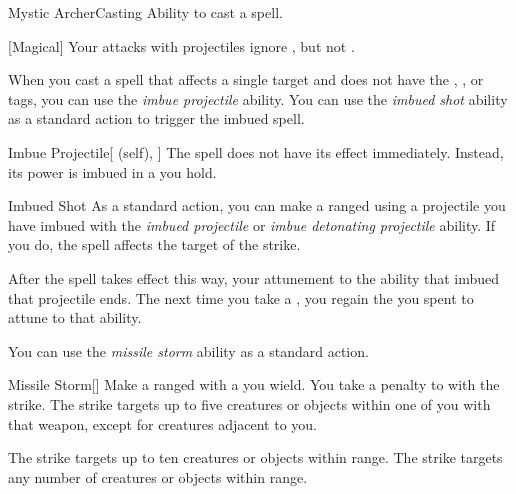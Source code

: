     \begin{feat}{Mystic Archer}{Casting}
        \featpre Ability to cast a spell.

        [Magical] Your attacks with projectiles ignore , but not .

         When you cast a spell that affects a single target and does not have the , , or  tags,
            you can use the \textit{imbue projectile} ability.
            You can use the \textit{imbued shot} ability as a standard action to trigger the imbued spell.
        \begin{attuneability}{Imbue Projectile}[ (self), ]
            The spell does not have its effect immediately.
            Instead, its power is imbued in a  you hold.
        \end{attuneability}

        \begin{freeability}{Imbued Shot}
            As a standard action, you can make a ranged  using a projectile you have imbued with the \textit{imbued projectile} or \textit{imbue detonating projectile} ability.
            If you do, the spell affects the target of the strike.

            After the spell takes effect this way, your attunement to the ability that imbued that projectile ends.
            The next time you take a , you regain the  you spent to attune to that ability.
        \end{freeability}

         You can use the \textit{missile storm} ability as a standard action.
        \begin{freeability}{Missile Storm}[]
            Make a ranged  with a  you wield.
            You take a  penalty to  with the strike.
            The strike targets up to five creatures or objects within one  of you with that weapon, except for creatures adjacent to you.

            \rankline
             The strike targets up to ten creatures or objects within range.
             The strike targets any number of creatures or objects within range.
        \end{freeability}


\end{feat}
